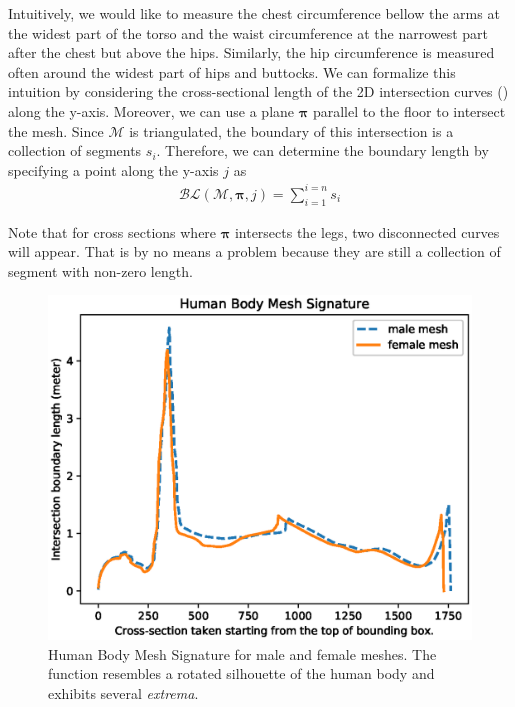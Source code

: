 \documentclass[10pt,twocolumn,letterpaper]{article}
\begin{document}
Intuitively, we would like to measure the chest circumference bellow the arms 
at the widest part of the torso and the waist circumference at the 
narrowest part after the chest but above the hips. Similarly, the hip 
circumference is measured often around the widest part of hips and buttocks. We 
can formalize this intuition by considering the cross-sectional length of the 
2D intersection curves (\cite{book.compu.topo}) along the y-axis. Moreover, we 
can 
use a plane $\boldsymbol{\pi}$ parallel to the floor to intersect the mesh. 
Since $\mathcal{M}$ is 
triangulated, the boundary of this 
intersection is a collection of segments $s_i$. Therefore, we can 
determine the boundary length by specifying a point along the y-axis $j$ as
\begin{align}
\mathcal{BL}(\mathcal{M}, \boldsymbol{\pi}, j) = \sum_{i = 
1}^{i = n}s_i
\end{align}

Note that for cross sections where $\boldsymbol{\pi}$ intersects the legs, two 
disconnected curves will appear. That is by no means a problem because they are 
still a collection of segment with non-zero length.

\begin{figure}[t]
	\begin{center}
		\includegraphics[width=\linewidth]{Figure_1.eps}
	\end{center}
	\caption{Human Body Mesh Signature for male and female meshes. The 
		function resembles a rotated silhouette of the human body and exhibits 
		several \textit{extrema}.}
	\label{fig:hbm_signature}
\end{figure}
\end{document}

